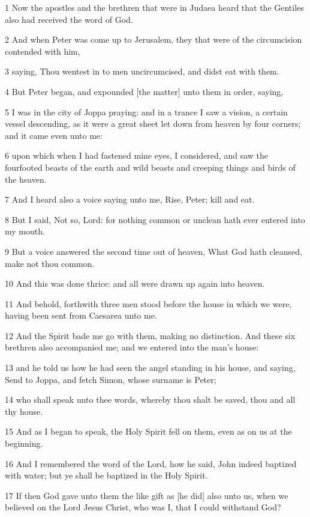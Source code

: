 \par 1 Now the apostles and the brethren that were in Judaea heard that the Gentiles also had received the word of God.
\par 2 And when Peter was come up to Jerusalem, they that were of the circumcision contended with him,
\par 3 saying, Thou wentest in to men uncircumcised, and didst eat with them.
\par 4 But Peter began, and expounded [the matter] unto them in order, saying,
\par 5 I was in the city of Joppa praying: and in a trance I saw a vision, a certain vessel descending, as it were a great sheet let down from heaven by four corners; and it came even unto me:
\par 6 upon which when I had fastened mine eyes, I considered, and saw the fourfooted beasts of the earth and wild beasts and creeping things and birds of the heaven.
\par 7 And I heard also a voice saying unto me, Rise, Peter; kill and eat.
\par 8 But I said, Not so, Lord: for nothing common or unclean hath ever entered into my mouth.
\par 9 But a voice answered the second time out of heaven, What God hath cleansed, make not thou common.
\par 10 And this was done thrice: and all were drawn up again into heaven.
\par 11 And behold, forthwith three men stood before the house in which we were, having been sent from Caesarea unto me.
\par 12 And the Spirit bade me go with them, making no distinction. And these six brethren also accompanied me; and we entered into the man's house:
\par 13 and he told us how he had seen the angel standing in his house, and saying, Send to Joppa, and fetch Simon, whose surname is Peter;
\par 14 who shall speak unto thee words, whereby thou shalt be saved, thou and all thy house.
\par 15 And as I began to speak, the Holy Spirit fell on them, even as on us at the beginning.
\par 16 And I remembered the word of the Lord, how he said, John indeed baptized with water; but ye shall be baptized in the Holy Spirit.
\par 17 If then God gave unto them the like gift as [he did] also unto us, when we believed on the Lord Jesus Christ, who was I, that I could withstand God?
